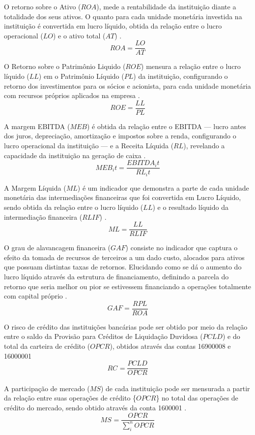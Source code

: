 \documentclass[12pt,12pt,openright,oneside,a4paper,chapter=TITLE,section=TITLE,subsection=TITLE,subsubsection=TITLE,english,french,spanish,portugues,sumario=tradicional]{abntex2}
\begin{document}
O retorno sobre o Ativo (\(ROA\)), mede a rentabilidade da instituição diante a totalidade dos seus ativos. O quanto para cada unidade monetária investida na instituição é convertida em lucro líquido, obtida da relação entre o lucro operacional (\(LO\)) e o ativo total (\(AT\)) \cite{assaf:2020}.\\
\[
ROA = \frac{LO}{AT}
\]

O Retorno sobre o Patrimônio Liquido (\(ROE\)) mensura a relação entre o lucro líquido (\(LL\)) em o Patrimônio Líquido (\(PL\)) da instituição, configurando o retorno dos investimentos para os sócios e acionista, para cada unidade monetária com recursos próprios aplicados na empresa \cite{assaf:2020}.\\
\[
ROE = \frac{LL}{PL}
\]

A margem EBITDA (\(MEB\)) é obtida da relação entre o EBITDA --- lucro antes dos juros, depreciação, amortização e impostos sobre a renda, configurando o lucro operacional da instituição --- e a Receita Líquida (\(RL\)), revelando a capacidade da instituição na geração de caixa \cite{assaf:2020}.
\[
MEB_it = \frac{EBITDA_it}{RL_it}
\]

A Margem Líquida (\(ML\)) é um indicador que demonstra a parte de cada unidade monetária das intermediações financeiras que foi convertida em Lucro Líquido, sendo obtida da relação entre o lucro líquido (\(LL\)) e o resultado líquido da intermediação financeira (\(RLIF\)) \cite{assaf:2020}.
\[
ML = \frac{LL}{RLIF}
\]

O grau de alavancagem financeira (\(GAF\)) consiste no indicador que captura o efeito da tomada de recursos de terceiros a um dado custo, alocados para ativos que possuam distintas taxas de retornos. Elucidando como se dá o aumento do lucro líquido através da estrutura de financiamento, definindo a parcela do retorno que seria melhor ou pior se estivessem financiando a operações totalmente com capital próprio \cite{assaf:2020}.
\[
GAF = \frac{RPL}{ROA}
\]

O risco de crédito das instituições bancárias pode ser obtido por meio da relação entre o saldo da Provisão para Créditos de Liquidação Duvidosa (\(PCLD\)) e do total da carteira de crédito (\(OPCR\)), obtidos através das contas 16900008 e 16000001 \cite{dantas:2012}
\[
RC_{} = \frac{PCLD_{}}{OPCR_{}}
\]

A participação de mercado (\(MS\)) de cada instituição pode ser mensurada a partir da relação entre suas operações de crédito \{\(OPCR\)\} no total das operações de crédito do mercado, sendo obtido através da conta 1600001 \cite{dantas:2012}.
\[
MS_{} = \frac{OPCR_{}}{\sum_{i}^{n}OPCR_{}} 
\]
\end{document}
